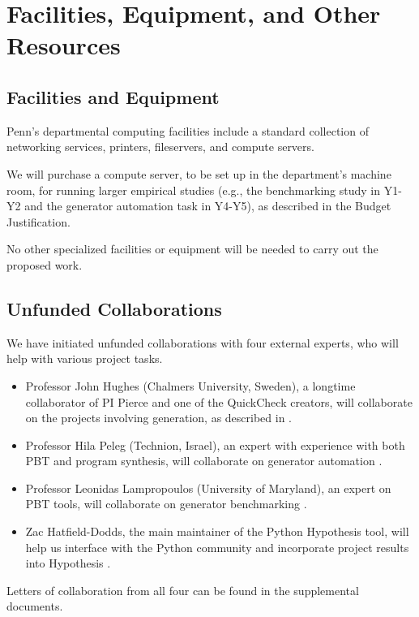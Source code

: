 \section*{Facilities, Equipment, and Other Resources}

\subsection*{Facilities and Equipment}

Penn's departmental computing facilities include a standard collection of
networking services, printers, fileservers, and compute servers.

We will purchase a compute server, to be set up in the department’s
machine room, for running larger empirical studies (e.g., the
benchmarking study in Y1-Y2 and the generator automation task in
Y4-Y5), as described in the Budget Justification.

No other specialized facilities or equipment will be needed to carry
out the proposed work.


\subsection*{Unfunded Collaborations}

We have initiated unfunded collaborations with four external experts,
who will help with various project tasks.
\begin{itemize}
\item Professor John Hughes (Chalmers University, Sweden), a longtime
collaborator of PI Pierce and one of the
QuickCheck creators, will collaborate on the projects involving
generation, as described in
.
\item Professor Hila Peleg (Technion, Israel), an expert with
experience with both PBT and program
synthesis, will collaborate on generator automation
.
\item Professor Leonidas Lampropoulos (University of Maryland), an
expert on PBT tools, will collaborate on generator benchmarking
.
\item Zac Hatfield-Dodds, the main maintainer of the Python Hypothesis
tool, will help us interface with the Python community and incorporate
project results into Hypothesis .
\end{itemize}
Letters of collaboration from all four can be found in the supplemental
documents.
